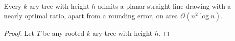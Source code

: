 
\begin{theorem}
	Every $k$-ary tree with height $h$ admits a planar straight-line drawing with a nearly optimal ratio, apart from a rounding error, on area $\mathcal{O}(n^2\log n)$.
\end{theorem}
\begin{proof}
	Let $T$ be any rooted $k$-ary tree with height $h$. 
\end{proof}
